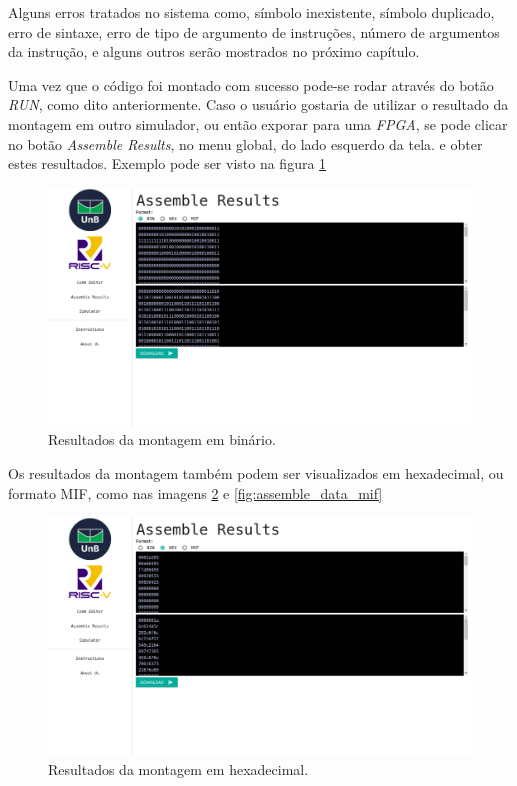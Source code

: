 	Alguns erros tratados no sistema como, símbolo inexistente, símbolo duplicado, erro de sintaxe, erro de tipo de argumento de instruções, número de argumentos da instrução, e alguns outros serão mostrados no próximo capítulo.

	Uma vez que o código foi montado com sucesso pode-se rodar através do botão \textit{RUN}, como dito anteriormente. Caso o usuário gostaria de utilizar o resultado da montagem em outro simulador, ou então exporar para uma \textit{FPGA}, se pode clicar no botão \textit{Assemble Results}, no menu global, do lado esquerdo da tela. e obter estes resultados. Exemplo pode ser visto na figura \ref{fig:assemble_data_bin}

	\begin{figure}[h]
	  \includegraphics[width=\linewidth]{img/assemble_data_bin.png}
	  \caption{Resultados da montagem em binário.}
	  \label{fig:assemble_data_bin}
	\end{figure}

	Os resultados da montagem também podem ser visualizados em hexadecimal, ou formato MIF, como nas imagens \ref{fig:assemble_data_hex} e \ref{fig:assemble_data_mif}

	\begin{figure}[h]
	  \includegraphics[width=\linewidth]{img/assemble_data_hex.png}
	  \caption{Resultados da montagem em hexadecimal.}
	  \label{fig:assemble_data_hex}
	\end{figure}

